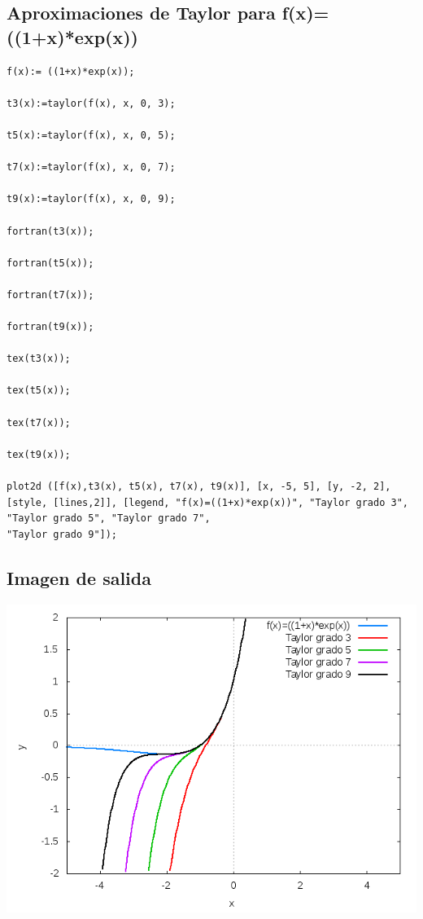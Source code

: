 \documentclass[letterpaper,10pt,twoside,onecolumn]{article}
\begin{document}
\subsection{Aproximaciones de Taylor para f(x)=((1+x)*exp(x))}
\begin{verbatim}
f(x):= ((1+x)*exp(x));

t3(x):=taylor(f(x), x, 0, 3);

t5(x):=taylor(f(x), x, 0, 5);

t7(x):=taylor(f(x), x, 0, 7);

t9(x):=taylor(f(x), x, 0, 9);

fortran(t3(x));

fortran(t5(x));

fortran(t7(x));

fortran(t9(x));

tex(t3(x));

tex(t5(x));

tex(t7(x));

tex(t9(x));

plot2d ([f(x),t3(x), t5(x), t7(x), t9(x)], [x, -5, 5], [y, -2, 2], 
[style, [lines,2]], [legend, "f(x)=((1+x)*exp(x))", "Taylor grado 3", 
"Taylor grado 5", "Taylor grado 7", 
"Taylor grado 9"]);
\end{verbatim}
\subsection{Imagen de salida}

\includegraphics[scale=.55]{linearExp.png}

\end{document}
